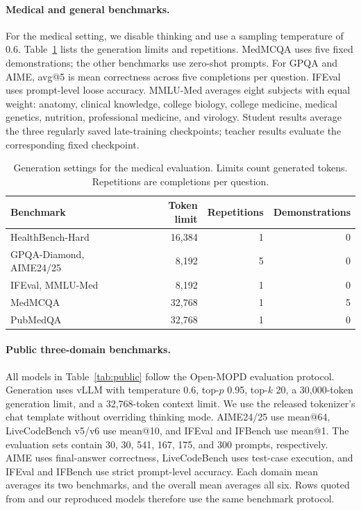 \documentclass{article}
\begin{document}
\paragraph{Medical and general benchmarks.}
For the medical setting, we disable thinking and use a sampling
temperature of 0.6. Table~\ref{tab:medical_eval} lists the
generation limits and repetitions. MedMCQA uses five fixed demonstrations;
the other benchmarks use zero-shot prompts.
For GPQA and AIME, avg@5 is mean correctness across five completions per
question. IFEval uses prompt-level loose accuracy. MMLU-Med averages eight
subjects with equal weight: anatomy, clinical knowledge, college biology,
college medicine, medical genetics, nutrition, professional medicine,
and virology.
Student results average the three regularly saved late-training
checkpoints; teacher results evaluate the corresponding fixed checkpoint.

\begin{table}[htbp]
\centering
\small
\caption{Generation settings for the medical evaluation.
Limits count generated tokens. Repetitions are completions per question.}
\label{tab:medical_eval}
\begin{tabular*}{\linewidth}{@{\extracolsep{\fill}}lrrr@{}}
\toprule
Benchmark & Token limit & Repetitions & Demonstrations \\
\midrule
HealthBench-Hard & 16,384 & 1 & 0 \\
GPQA-Diamond, AIME24/25 & 8,192 & 5 & 0 \\
IFEval, MMLU-Med & 8,192 & 1 & 0 \\
MedMCQA & 32,768 & 1 & 5 \\
PubMedQA & 32,768 & 1 & 0 \\
\bottomrule
\end{tabular*}
\end{table}

\paragraph{Public three-domain benchmarks.}
All models in Table~\ref{tab:public} follow the Open-MOPD evaluation
protocol. Generation uses vLLM with temperature 0.6, top-$p$ 0.95,
top-$k$ 20, a 30,000-token generation limit, and a 32,768-token context
limit. We use the released tokenizer's chat template without overriding
thinking mode. AIME24/25 use mean@64, LiveCodeBench v5/v6 use mean@10,
and IFEval and IFBench use mean@1. The evaluation sets contain 30, 30,
541, 167, 175, and 300 prompts, respectively. AIME uses final-answer
correctness, LiveCodeBench uses test-case execution, and IFEval and
IFBench use strict prompt-level accuracy. Each domain mean averages its
two benchmarks, and the overall mean averages all six. Rows quoted from
\citet{ref3} and our reproduced models therefore use the same benchmark
protocol.
\end{document}
